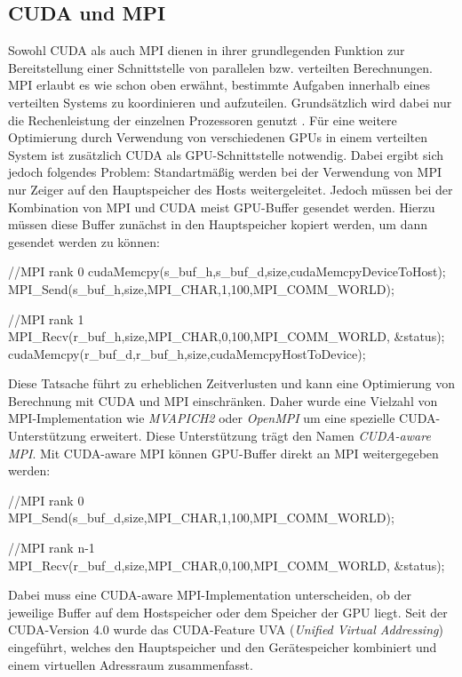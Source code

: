 \documentclass[doktyp=semarbeit, sprache=german]{TUBAFarbeiten}
\begin{document}
\subsection{CUDA und MPI}
Sowohl CUDA als auch MPI dienen in ihrer grundlegenden Funktion zur Bereitstellung einer Schnittstelle von parallelen bzw. verteilten Berechnungen. MPI erlaubt es wie schon oben erwähnt, bestimmte Aufgaben innerhalb eines verteilten Systems zu koordinieren und aufzuteilen. Grundsätzlich wird dabei nur die Rechenleistung der einzelnen Prozessoren genutzt \cite{CUDAAwareMPI}.
Für eine weitere Optimierung durch Verwendung von verschiedenen GPUs in einem verteilten System ist zusätzlich CUDA als GPU-Schnittstelle notwendig.
Dabei ergibt sich jedoch folgendes Problem: Standartmäßig werden bei der Verwendung von MPI nur Zeiger auf den Hauptspeicher des Hosts weitergeleitet. Jedoch müssen bei der Kombination von MPI und CUDA meist GPU-Buffer gesendet werden. Hierzu müssen diese Buffer zunächst in den Hauptspeicher kopiert werden, um dann gesendet werden zu können:
\begin{CPP}
//MPI rank 0
cudaMemcpy(s_buf_h,s_buf_d,size,cudaMemcpyDeviceToHost);
MPI_Send(s_buf_h,size,MPI_CHAR,1,100,MPI_COMM_WORLD);

//MPI rank 1
MPI_Recv(r_buf_h,size,MPI_CHAR,0,100,MPI_COMM_WORLD, &status);
cudaMemcpy(r_buf_d,r_buf_h,size,cudaMemcpyHostToDevice);
\end{CPP}
Diese Tatsache führt zu erheblichen Zeitverlusten und kann eine Optimierung von Berechnung mit CUDA und MPI einschränken. Daher wurde eine Vielzahl von MPI-Implementation wie \textit{MVAPICH2} oder \textit{OpenMPI} um eine spezielle CUDA-Unterstützung erweitert. Diese Unterstützung trägt den Namen \textit{CUDA-aware MPI}. Mit CUDA-aware MPI können GPU-Buffer direkt an MPI weitergegeben werden:
\begin{CPP}
//MPI rank 0
MPI_Send(s_buf_d,size,MPI_CHAR,1,100,MPI_COMM_WORLD);

//MPI rank n-1
MPI_Recv(r_buf_d,size,MPI_CHAR,0,100,MPI_COMM_WORLD, &status);
\end{CPP}
Dabei muss eine CUDA-aware MPI-Implementation unterscheiden, ob der jeweilige Buffer auf dem Hostspeicher oder dem Speicher der GPU liegt. Seit der CUDA-Version 4.0 wurde das CUDA-Feature UVA (\textit{Unified Virtual Addressing}) eingeführt, welches den Hauptspeicher und den Gerätespeicher kombiniert und einem virtuellen Adressraum zusammenfasst.
\end{document}
